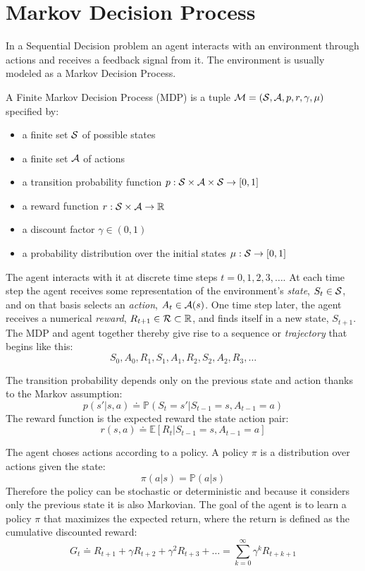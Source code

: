\section{Markov Decision Process}
In a Sequential Decision problem an agent interacts with an environment through actions and receives a feedback signal from it.
The environment is usually modeled as a Markov Decision Process.
\\
\begin{definition}
A Finite Markov Decision Process (MDP) is a tuple $\mathcal{M} = (\mathcal{S}, \mathcal{A}, p, r, \gamma, \mu)$ specified by:
\begin{itemize}
    \item a finite set $\mathcal{S}$ of possible states
    \item a finite set $\mathcal{A}$ of actions
    \item a transition probability function $p: \mathcal{S} \times \mathcal{A} \times \mathcal{S} \to [0, 1]$
    \item a reward function $r: \mathcal{S} \times \mathcal{A} \to \mathbb{R} $
    \item a discount factor $\gamma \in (0,1)$
    \item a probability distribution over the initial states $\mu: \mathcal{S} \to [0, 1]$

\end{itemize}
\end{definition}

The agent interacts with it at discrete time steps $t = 0,1,2,3,\dots$.
At each time step the agent receives some representation of the environment's \textit{state}, $S_t \in \mathcal{S}$, and on that basis
selects an \textit{action}, $A_t \in \mathcal{A}(s)$. One time step later, the agent receives a numerical \textit{reward}, $R_{t+1} \in \mathcal{R} \subset \mathbb{R}$,
and finds itself in a new state, $S_{t+1}$. The MDP and agent together thereby give rise to a sequence or \textit{trajectory} that begins like this:
\[ S_0, A_0, R_1, S_1, A_1, R_2, S_2, A_2, R_3, \dots\]

The transition probability depends only on the previous state and action thanks to the Markov assumption:
\[p(s'|s,a) \doteq \mathbb{P}(S_t = s' | S_{t-1}=s, A_{t-1}=a)\]
The reward function is the expected reward the state action pair:
\[r(s,a) \doteq \mathbb{E}[R_t | S_{t-1} = s, A_{t-1} = a]\]

The agent choses actions according to a policy. A policy $\pi$ is a distribution over actions given the state:
\[\pi(a|s)=\mathbb{P}(a|s)\]
Therefore the policy can be stochastic or deterministic and because it considers only the previous state it is also Markovian.
The goal of the agent is to learn a policy $\pi$ that maximizes the expected return, where the return is defined as the cumulative discounted reward:
\[G_t \doteq R_{t+1} + \gamma R_{t+2} + \gamma^2 R_{t+3} + \dots = \sum_{k=0}^{\infty}\gamma^k R_{t+k+1}\]

